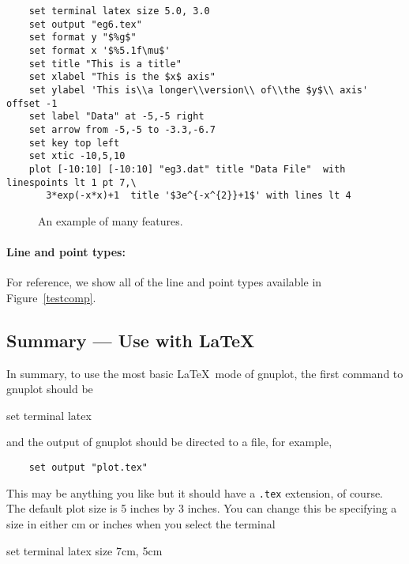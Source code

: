 \singlespace
\begin{verbatim}
    set terminal latex size 5.0, 3.0
    set output "eg6.tex"
    set format y "$%g$"
    set format x '$%5.1f\mu$'
    set title "This is a title"
    set xlabel "This is the $x$ axis" 
    set ylabel 'This is\\a longer\\version\\ of\\the $y$\\ axis' offset -1
    set label "Data" at -5,-5 right
    set arrow from -5,-5 to -3.3,-6.7
    set key top left
    set xtic -10,5,10
    plot [-10:10] [-10:10] "eg3.dat" title "Data File"  with linespoints lt 1 pt 7,\
       3*exp(-x*x)+1  title '$3e^{-x^{2}}+1$' with lines lt 4
\end{verbatim}
\currentspace

\begin{figure}
  \begin{center}
    
  \end{center}
  \caption{An example of many features.}
  \label{eg6}
\end{figure}

\paragraph{Line and point types:} For reference, we show all of the
line and point types available in Figure~\ref{testcomp}.

\subsection{Summary --- Use with \LaTeX}
In summary, to use the most basic \LaTeX\ mode of gnuplot, the first
command to gnuplot should be
\begin{syntax}
    set terminal latex
\end{syntax}
and the output of gnuplot should be directed to a file, for example,
\begin{verbatim}
    set output "plot.tex"
\end{verbatim}
This may be anything you like but it should have a {\tt .tex} extension,
of course. The default plot size is 5 inches by 3 inches.
You can change this be specifying a size in either cm or inches when 
you select the terminal
\begin{syntax}
    set terminal latex size 7cm, 5cm
\end{syntax}


